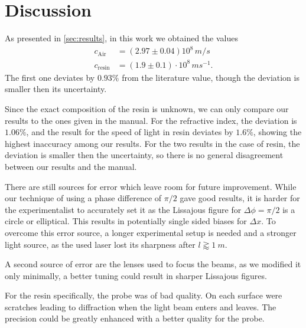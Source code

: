 \section{Discussion}
\label{sec:discussion}
As presented in \autoref{sec:results}, in this work we obtained the values
\begin{align}
  c_\text{Air} &= (2.97 \pm 0.04) 10^8 \, \si{m/s} \\
  c_\text{resin} &= (1.9 \pm 0.1) \cdot 10^8 \, \si{ms^{-1}}.
\end{align}
The first one deviates by $0.93 \%$ from the literature value, though the deviation is smaller then
its uncertainty.

Since the exact composition of the resin is unknown, we can only compare our results to the ones
given in the manual. For the refractive index, the deviation is $1.06 \%$, and the result for the
speed of light in resin deviates by $1.6 \%$, showing the highest inaccuracy among our results. For
the two results in the case of resin, the deviation is smaller then the uncertainty, so there is no
general disagreement between our results and the manual.

There are still sources for error which leave room for future improvement. While our technique of
using a phase difference of $\pi/2$ gave good results, it is harder for the experimentalist to
accurately set it as the Lissajous figure for $\Delta \phi = \pi/2$ is a circle or elliptical. This
results in potentially single sided biases for $\Delta x$. To overcome this error source, a longer
experimental setup is needed and a stronger light source, as the used laser lost its sharpness after
$l \gtrapprox \SI{1}{m}$.

A second source of error are the lenses used to focus the beams, as we modified it only minimally, a
better tuning could result in sharper Lissajous figures.

For the resin specifically, the probe was of bad quality. On each surface were scratches leading to
diffraction when the light beam enters and leaves. The precision could be greatly enhanced with a
better quality for the probe.

